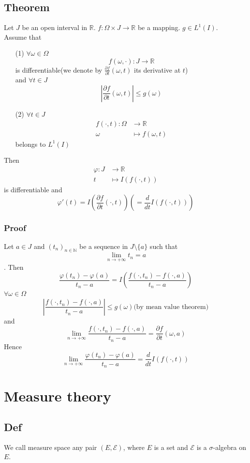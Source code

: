 \documentclass{book}
\newcommand{\abs}[1]{\left\lvert #1 \right\rvert}
\begin{document}
\section{Theorem}
Let $J$ be an open interval in $\mathbb{R}$. $f:\Omega\times J\rightarrow\mathbb{R}$ be a mapping. $g\in L^1(I)$. \\
Assume that
\begin{itemize}
    \item [(1)] $\forall \omega\in \Omega$$$f(\omega,\cdot):J\rightarrow\mathbb{R}$$ is differentiable(we denote by $\frac{\partial f}{\partial t}(\omega,t)$ its derivative at $t$)\\
    and $\forall t\in J$$$\abs{\frac{\partial f}{\partial t}(\omega,t)}\leq g(\omega)$$
    \item [(2)] $\forall t\in J$
    $$\begin{aligned}
        f(\cdot,t):\Omega &\rightarrow\mathbb{R}\\ \omega &\mapsto f(\omega,t)
    \end{aligned}$$ belongs to $L^1(I)$
\end{itemize}
Then $$\begin{aligned}
    \varphi: J &\rightarrow\mathbb{R}\\ t &\mapsto I(f(\cdot,t))
\end{aligned}$$
is differentiable and $$\varphi'(t)=I(\frac{\partial f}{\partial t}(\cdot,t))(=\frac{d}{dt}I(f(\cdot,t)))$$
\subsection*{Proof}
Let $a\in J$ and $(t_n)_{n\in \mathbb{N}}$ be a sequence in $J\setminus\{a\}$ such that$$\lim\limits_{n\rightarrow+\infty}t_n=a$$. Then $$\frac{\varphi(t_n)-\varphi(a)}{t_n-a}=I(\frac{f(\cdot,t_n)-f(\cdot,a)}{t_n-a})$$
$\forall \omega\in \Omega$
$$\abs{\frac{f(\cdot,t_n)-f(\cdot,a)}{t_n-a}}\leq g(\omega)\text{(by mean value theorem)}$$and 
$$\lim\limits_{n\rightarrow+\infty}\frac{f(\cdot,t_n)-f(\cdot,a)}{t_n-a}=\frac{\partial f}{\partial t}(\omega,a)$$
Hence$$\lim\limits_{n\rightarrow+\infty}\frac{\varphi(t_n)-\varphi(a)}{t_n-a}=\frac{d}{dt}I(f(\cdot,t))$$

\chapter{Measure theory}

\section{Def}
We call measure space any pair $(E,\mathcal{E})$, where $E$ is a set and $\mathcal{E}$ is a $\sigma$-algebra on $E$.
\end{document}
